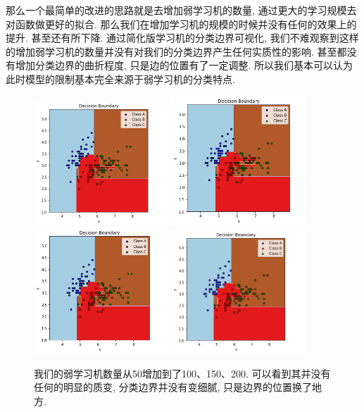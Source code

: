 \documentclass[lang=cn,11pt]{elegantpaper}
\begin{document}

那么一个最简单的改进的思路就是去增加弱学习机的数量, 通过更大的学习规模去对函数做更好的拟合. 那么我们在增加学习机的规模的时候并没有任何的效果上的提升. 甚至还有所下降. 通过简化版学习机的分类边界可视化, 我们不难观察到这样的增加弱学习机的数量并没有对我们的分类边界产生任何实质性的影响. 甚至都没有增加分类边界的曲折程度, 只是边的位置有了一定调整. 所以我们基本可以认为此时模型的限制基本完全来源于弱学习机的分类特点.


\begin{figure}[hbt]
\centering
  \includegraphics[width=0.45\textwidth]{adat50}
  \includegraphics[width=0.45\textwidth]{adat100}\\
  \includegraphics[width=0.45\textwidth]{adat150}
  \includegraphics[width=0.45\textwidth]{adat200}
  \caption{我们的弱学习机数量从50增加到了100、150、200. 可以看到其并没有任何的明显的质变, 分类边界并没有变细腻, 只是边界的位置换了地方.}
\end{figure}
\end{document}
